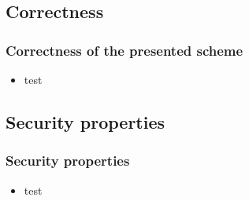 \subsection{Correctness}
	\begin{frame}
		\frametitle{Correctness of the presented scheme}
		\begin{itemize}
			\item test
		\end{itemize}
	\end{frame}
	
\subsection{Security properties}
	\begin{frame}
		\frametitle{Security properties}
		\begin{itemize}
			\item test
		\end{itemize}
	\end{frame}